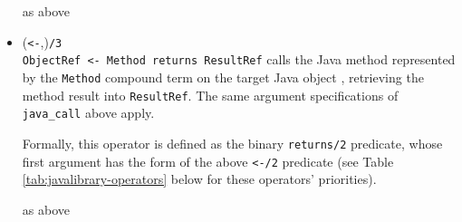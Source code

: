 \begin{itemize}

    \exception{} as above

\item (\verb|<-|,)\texttt{/3}\\
    \noindent\verb|ObjectRef <- Method returns ResultRef| calls the Java method represented by the \texttt{Method} compound term on the target Java object , retrieving the method result into \texttt{ResultRef}. The same argument specifications of \texttt{java\_call} above apply.

    Formally, this operator is defined as the binary \texttt{returns/2} predicate, whose first argument has the form of the above \verb|<-/2| predicate (see Table \ref{tab:javalibrary-operators} below for these operators' priorities).


    \exception{} as above
\end{itemize}

